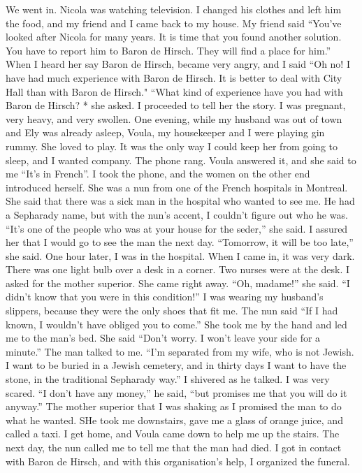 We went in.
Nicola was watching television.
I changed his clothes
and left him the food, and my friend and I came back to my house.
My 
friend said “You've looked after Nicola for many years.
It is time 
that you found another solution.
You have to report him to Baron de 
Hirsch.
They will find a place for him.” 
When I heard her say Baron de Hirsch, became very angry, and I 
said “Oh no!
I have had much experience with Baron de Hirsch.
It is 
better to deal with City Hall than with Baron de Hirsch."
“What kind of experience have you had with Baron de Hirsch?
* she asked.
I proceeded to tell her the story.
I was pregnant, very heavy, and very swollen.
One evening, while my husband was out of town and Ely was already asleep, Voula, my housekeeper and I were playing gin rummy.
She loved to play.
It was the only way I could keep her from going to sleep, and I wanted company.
The phone rang.
Voula answered it, and she said to me “It’s in French”.
I took the phone, and the women on the other end introduced herself.
She was a nun from one of the French hospitals in Montreal.
She said that there was a sick man in the hospital who wanted to see me.
He had a Sepharady name, but with the nun’s accent, I couldn’t figure out who he was.
“It’s one of the people who was at your house for the seder,” she said.
I assured her that I would go to see the man the next day.
“Tomorrow, it will be too late,” she said.
One hour later, I was in the hospital.
When I came in, it was very dark.
There was one light bulb over a desk in a corner.
Two nurses were at the desk.
I asked for the mother superior.
She came right away.
“Oh, madame!” she said.
“I didn’t know that you were in this condition!” I was wearing my husband’s slippers, because they were the only shoes that fit me.
The nun said “If I had known, I wouldn’t have obliged you to come.” She took me by the hand and led me to the man’s bed.
She said “Don’t worry.
I won’t leave your side for a minute.”
The man talked to me.
“I’m separated from my wife, who is not Jewish.
I want to be buried in a Jewish cemetery, and in thirty days I want to have the stone, in the traditional Sepharady way.” I shivered as he talked.
I was very scared.
“I don’t have any money,” he said, “but promises me that you will do it anyway.” The mother superior that I was shaking as I promised the man to do what he wanted.
SHe took me downstairs, gave me a glass of orange juice, and called a taxi.
I get home, and Voula came down to help me up the stairs.
The next day, the nun called me to tell me that the man had died.
I got in contact with Baron de Hirsch, and with this organisation’s help, I organized the funeral.
